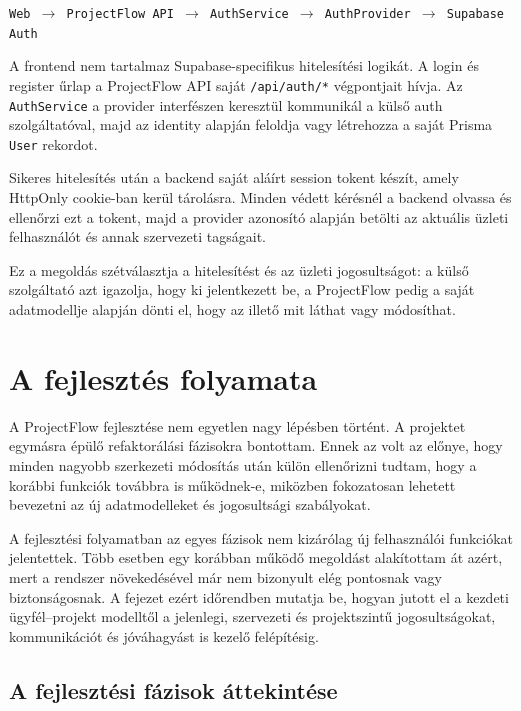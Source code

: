 \documentclass[11pt,a4paper]{report}
\newcommand{\projectname}{ProjectFlow}
\begin{document}
    \begin{center}
        \texttt{Web $\rightarrow$ ProjectFlow API $\rightarrow$ AuthService
            $\rightarrow$ AuthProvider $\rightarrow$ Supabase Auth}
    \end{center}

    A frontend nem tartalmaz Supabase-specifikus hitelesítési logikát. A login és
    register űrlap a ProjectFlow API saját \texttt{/api/auth/*} végpontjait hívja.
    Az \texttt{AuthService} a provider interfészen keresztül kommunikál a külső
    auth szolgáltatóval, majd az identity alapján feloldja vagy létrehozza a saját
    Prisma \texttt{User} rekordot.

    Sikeres hitelesítés után a backend saját aláírt session tokent készít, amely
    HttpOnly cookie-ban kerül tárolásra. Minden védett kérésnél a backend olvassa
    és ellenőrzi ezt a tokent, majd a provider azonosító alapján betölti az aktuális
    üzleti felhasználót és annak szervezeti tagságait.

    Ez a megoldás szétválasztja a hitelesítést és az üzleti jogosultságot: a külső
    szolgáltató azt igazolja, hogy ki jelentkezett be, a ProjectFlow pedig a saját
    adatmodellje alapján dönti el, hogy az illető mit láthat vagy módosíthat.

    \chapter{A fejlesztés folyamata}

    A \projectname{} fejlesztése nem egyetlen nagy lépésben történt. A projektet
    egymásra épülő refaktorálási fázisokra bontottam. Ennek az volt az előnye, hogy
    minden nagyobb szerkezeti módosítás után külön ellenőrizni tudtam, hogy a korábbi
    funkciók továbbra is működnek-e, miközben fokozatosan lehetett bevezetni az új
    adatmodelleket és jogosultsági szabályokat.

    A fejlesztési folyamatban az egyes fázisok nem kizárólag új felhasználói
    funkciókat jelentettek. Több esetben egy korábban működő megoldást alakítottam
    át azért, mert a rendszer növekedésével már nem bizonyult elég pontosnak vagy
    biztonságosnak. A fejezet ezért időrendben mutatja be, hogyan jutott el a
    kezdeti ügyfél--projekt modelltől a jelenlegi, szervezeti és projektszintű
    jogosultságokat, kommunikációt és jóváhagyást is kezelő felépítésig.

    \section{A fejlesztési fázisok áttekintése}
\end{document}
